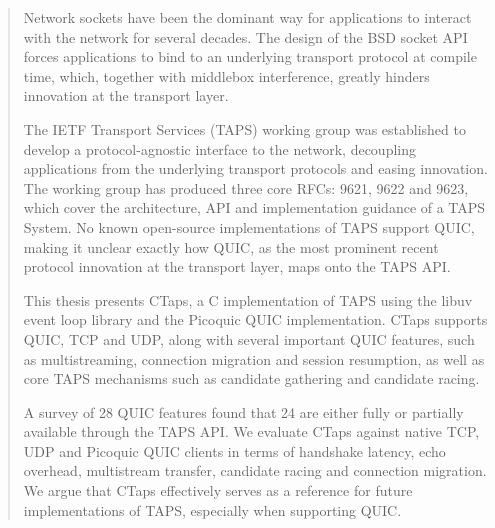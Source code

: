 \begin{abstract}
Network sockets have been the dominant way for applications to interact with the
network for several decades. The design of the BSD socket API forces applications to
bind to an underlying transport protocol at compile time, which, together
with middlebox interference, greatly hinders innovation at the transport layer.

The IETF Transport Services (TAPS) working group was established to develop a
protocol-agnostic interface to the network, decoupling applications from the underlying
transport protocols and easing innovation.
The working group has produced three core RFCs: 9621, 9622 and 9623, which cover the architecture,
API and implementation guidance of a TAPS System.
No known open-source implementations
of TAPS support QUIC, making it unclear exactly how QUIC, as the most prominent recent protocol innovation
at the transport layer, maps onto the TAPS API.

This thesis presents CTaps, a C implementation of TAPS using the libuv event loop library and the Picoquic
QUIC implementation.
CTaps supports QUIC, TCP and
UDP, along with several important QUIC features, such as multistreaming, connection
migration and session resumption, as well as core TAPS
mechanisms such as candidate gathering and candidate racing.

A survey of 28 QUIC features found that 24 are
either fully or partially available through the TAPS API.
We evaluate CTaps against native TCP, UDP and Picoquic QUIC clients in terms of handshake
latency, echo overhead, multistream transfer, candidate racing and connection migration.
We argue that CTaps effectively serves as a reference for future implementations of TAPS,
especially when supporting QUIC.
\end{abstract}
